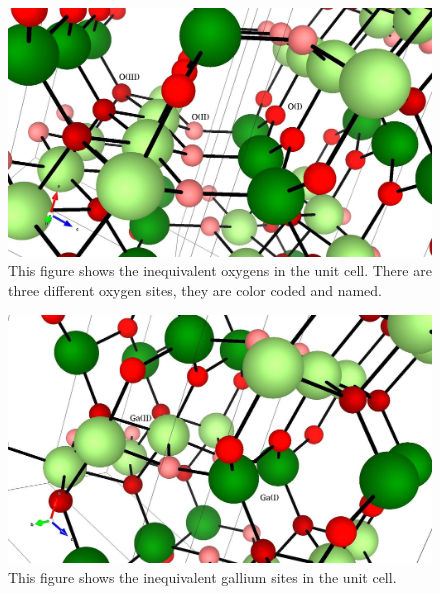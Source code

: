 \begin{figure}[H]
\includegraphics[width=\linewidth]{../fig/Ga2O3-different-sites-names}\caption{This figure shows the inequivalent oxygens in the unit cell. There are three different oxygen sites, they are color coded and named.}\label{fig:oxygen_sites}
\end{figure}

\begin{figure}[H]
\includegraphics[width=\linewidth]{../fig/Ga2O3-Ga-sites}\caption{This figure shows the inequivalent gallium sites in the unit cell.}\label{fig:gallium_sites}
\end{figure}

